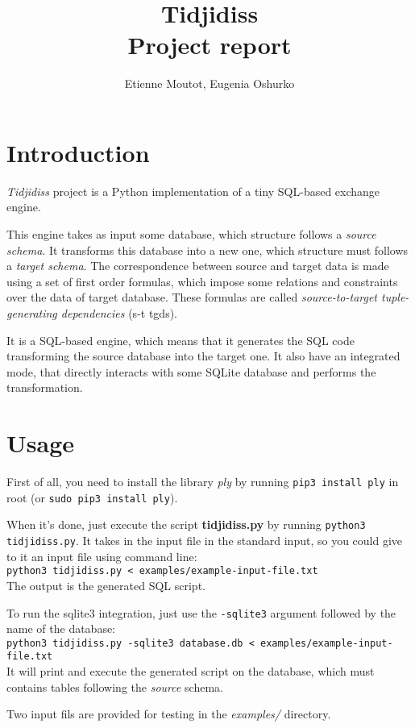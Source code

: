 \documentclass[a4paper,11pt]{article}
\title{{\Huge Tidjidiss}\\
Project report}
\author{Etienne Moutot, Eugenia Oshurko}
\begin{document}
\maketitle

\section{Introduction}
\textit{Tidjidiss} project is a Python implementation of a tiny SQL-based exchange engine.

This engine takes as input some database, which structure follows a \textit{source schema}. It transforms this database into a new one, which structure must follows a \textit{target schema}. The correspondence between source and target data is made using a set of first order formulas, which impose some relations and constraints over the data of target database. These formulas are called \textit{source-to-target tuple-generating dependencies} (s-t tgds).

It is a SQL-based engine, which means that it generates the SQL code transforming the source database into the target one. It also have an integrated mode, that directly interacts with some SQLite database and performs the transformation.

\section{Usage}
First of all, you need to install the library \textit{ply} by running \texttt{pip3 install ply} in root (or \texttt{sudo pip3 install ply}).

When it's done, just execute the script \textbf{tidjidiss.py} by running \texttt{python3 tidjidiss.py}. It takes in the input file in the standard input, so you could give to it an input file using command line:\\
\texttt{python3 tidjidiss.py < examples/example-input-file.txt}\\
The output is the generated SQL script.

To run the sqlite3 integration, just use the \texttt{-sqlite3} argument followed by the name of the database:\\
\texttt{python3 tidjidiss.py -sqlite3 database.db < examples/example-input-file.txt}\\
It will print and execute the generated script on the database, which must contains tables following the \textit{source} schema.

Two input fils are provided for testing in the \textit{examples/} directory.
\end{document}
